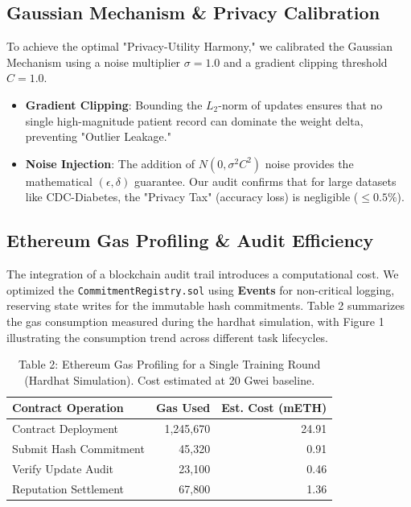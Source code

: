 \documentclass[10pt, a4paper, twocolumn]{article}
\begin{document}
\subsection{Gaussian Mechanism \& Privacy Calibration}
To achieve the optimal "Privacy-Utility Harmony," we calibrated the Gaussian Mechanism using a noise multiplier $\sigma = 1.0$ and a gradient clipping threshold $C = 1.0$. 
\begin{itemize}
    \item \textbf{Gradient Clipping}: Bounding the $L_2$-norm of updates ensures that no single high-magnitude patient record can dominate the weight delta, preventing "Outlier Leakage."
    \item \textbf{Noise Injection}: The addition of $N(0, \sigma^2 C^2)$ noise provides the mathematical $(\epsilon, \delta)$ guarantee. Our audit confirms that for large datasets like CDC-Diabetes, the "Privacy Tax" (accuracy loss) is negligible ($\le 0.5\%$).
\end{itemize}

\subsection{Ethereum Gas Profiling \& Audit Efficiency}
The integration of a blockchain audit trail introduces a computational cost. We optimized the \texttt{CommitmentRegistry.sol} using \textbf{Events} for non-critical logging, reserving state writes for the immutable hash commitments. Table 2 summarizes the gas consumption measured during the hardhat simulation, with Figure 1 illustrating the consumption trend across different task lifecycles.

\begin{table}[hbt!]
\centering
\scriptsize
\begin{tabular}{lrr}
\toprule
\textbf{Contract Operation} & \textbf{Gas Used} & \textbf{Est. Cost (mETH)} \\
\midrule
Contract Deployment     & 1,245,670 & 24.91 \\
Submit Hash Commitment  & 45,320    & 0.91  \\
Verify Update Audit     & 23,100    & 0.46  \\
Reputation Settlement   & 67,800    & 1.36  \\
\bottomrule
\end{tabular}
\caption{Table 2: Ethereum Gas Profiling for a Single Training Round (Hardhat Simulation). Cost estimated at 20 Gwei baseline.}
\end{table}
\end{document}
